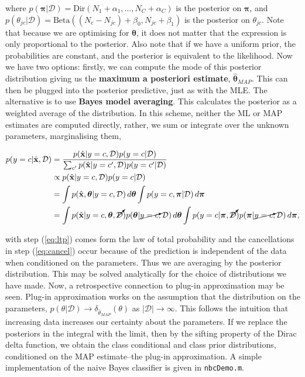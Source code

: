 \documentclass[11pt]{amsart}
\begin{document}
where $p(\boldsymbol\pi|\mathcal{D}) = \text{Dir}(N_1 + \alpha_1, \dots, N_C + \alpha_C)$ is the posterior on $\boldsymbol\pi$, and $p(\theta_{jc}|\mathcal{D}) = \text{Beta}((N_c - N_{jc}) + \beta_0, N_{jc} + \beta_1)$ is the posterior on $\theta_{jc}$. Note that because we are optimising for $\boldsymbol\theta$, it does not matter that the expression is only proportional to the posterior. Also note that if we have a uniform prior, the probabilities are constant, and the posterior is equivalent to the likelihood. Now we have two options: firstly, we can compute the mode of this posterior distribution giving us the \textbf{maximum a posteriori estimate}, $\hat{\boldsymbol\theta}_{MAP}$. This can then be plugged into the posterior predictive, just as with the MLE. The alternative is to use \textbf{Bayes model averaging}. This calculates the posterior as a weighted average of the distribution. In this scheme, neither the ML or MAP estimates are computed directly, rather, we sum or integrate over the unknown parameters, marginalising them,

\begin{align}
p(y = c|\hat{\mathbf{x}}, \mathcal{D}) &= \frac{p(\hat{\mathbf{x}}|y = c, \mathcal{D})p(y=c|\mathcal{D})}{\sum_{c'}p(\hat{\mathbf{x}}|y = c', \mathcal{D})p(y=c'|\mathcal{D})} \notag \\ &\propto p(\hat{\mathbf{x}}|y = c, \mathcal{D})p(y=c|\mathcal{D}) \notag \\
&= \int p(\hat{\mathbf{x}}, \boldsymbol\theta|y = c, \mathcal{D})\mathop{d\boldsymbol\theta}\int p(y=c, \boldsymbol\pi|\mathcal{D})\mathop{d\boldsymbol\pi} \label{eq:ltp} \\
&= \int p(\hat{\mathbf{x}}|y = c, \boldsymbol\theta, \cancelto{}{\mathcal{D}})p(\boldsymbol\theta|\cancelto{}{y = c}, \mathcal{D})\mathop{d\boldsymbol\theta}\int p(y=c|\boldsymbol\pi, \cancelto{}{\mathcal{D}})p(\boldsymbol\pi|\cancelto{}{y = c}, \mathcal{D})\mathop{d\boldsymbol\pi}, \label{eq:cancel}
\end{align}

with step (\ref{eq:ltp}) comes form the law of total probability and the cancellations in step (\ref{eq:cancel}) occur because of the prediction is independent of the data when conditioned on the parameters. Thus we are averaging by the posterior distribution. This may be solved analytically for the choice of distributions we have made. Now, a retrospective connection to plug-in approximation may be seen. Plug-in approximation works on the assumption that the distribution on the parameters, $p(\theta|\mathcal{D}) \to \delta_{\hat{\theta}_{MAP}}(\theta)$ as $|\mathcal{D}| \to \infty$. This follows the intuition that increasing data increases our certainty about the parameters. If we replace the posteriors in the integral with the limit, then by the sifting property of the Dirac delta function, we obtain the class conditional and class prior distributions, conditioned on the MAP estimate--the plug-in approximation. A simple implementation of the naive Bayes classifier is given in \texttt{nbcDemo.m}. 
\end{document}
